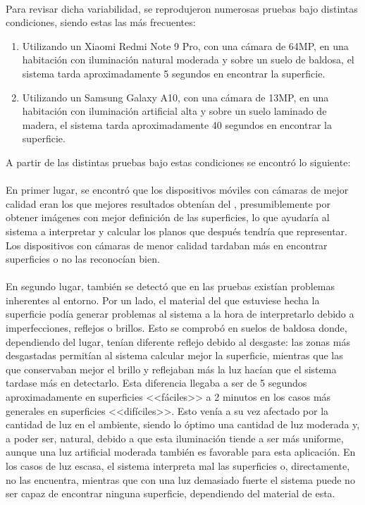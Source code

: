 \documentclass{subfiles}
\begin{document}
    \paragraph{}
    Para revisar dicha variabilidad, se reprodujeron numerosas pruebas bajo distintas condiciones, siendo estas las más frecuentes:
    \begin{enumerate}
        \item Utilizando un Xiaomi Redmi Note 9 Pro, con una cámara de 64MP, en una habitación con iluminación natural moderada y sobre un suelo de baldosa, el sistema tarda aproximadamente 5 segundos en encontrar la superficie.
        \item Utilizando un Samsung Galaxy A10, con una cámara de 13MP, en una habitación con iluminación artificial alta y sobre un suelo laminado de madera, el sistema tarda aproximadamente 40 segundos en encontrar la superficie.
    \end{enumerate}

    A partir de las distintas pruebas bajo estas condiciones se encontró lo siguiente:

    \paragraph{}
    En primer lugar, se encontró que los dispositivos móviles con cámaras de mejor calidad eran los que mejores resultados obtenían del \hittest, presumiblemente por obtener imágenes con mejor definición de las superficies, lo que ayudaría al sistema a interpretar y calcular los planos que después tendría que representar. Los dispositivos con cámaras de menor calidad tardaban más en encontrar superficies o no las reconocían bien.

    \paragraph{}
    En segundo lugar, también se detectó que en las pruebas existían problemas inherentes al entorno. Por un lado, el material del que estuviese hecha la superficie podía generar problemas al sistema a la hora de interpretarlo debido a imperfecciones, reflejos o brillos. Esto se comprobó en suelos de baldosa donde, dependiendo del lugar, tenían diferente reflejo debido al desgaste: las zonas más desgastadas permitían al sistema calcular mejor la superficie, mientras que las que conservaban mejor el brillo y reflejaban más la luz hacían que el sistema tardase más en detectarlo. Esta diferencia llegaba a ser de 5 segundos aproximadamente en superficies <<fáciles>> a 2 minutos en los casos más generales en superficies <<difíciles>>. Esto venía a su vez afectado por la cantidad de luz en el ambiente, siendo lo óptimo una cantidad de luz moderada y, a poder ser, natural, debido a que esta iluminación tiende a ser más uniforme, aunque una luz artificial moderada también es favorable para esta aplicación. En los casos de luz escasa, el sistema interpreta mal las superficies o, directamente, no las encuentra, mientras que con una luz demasiado fuerte el sistema puede no ser capaz de encontrar ninguna superficie, dependiendo del material de esta.
\end{document}
